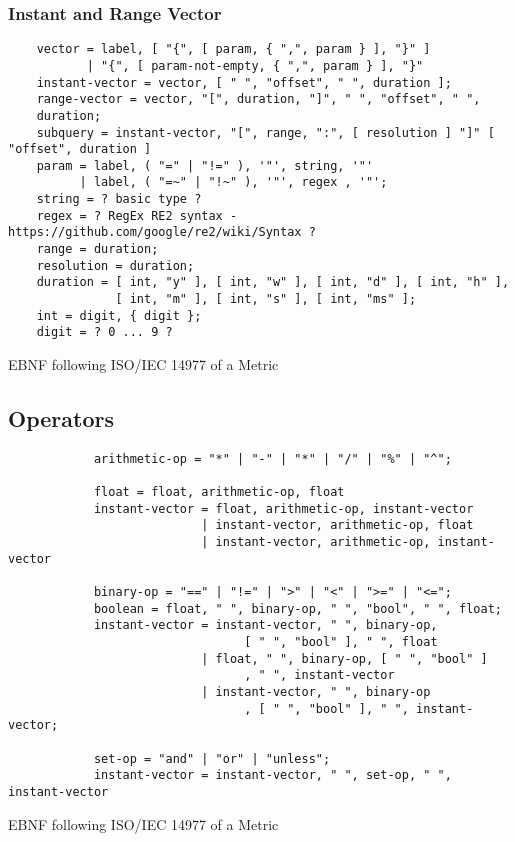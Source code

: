 \subsubsection{Instant and Range Vector}
\begin{listing}[H]
\begin{samepage}
\begin{verbatim}
	vector = label, [ "{", [ param, { ",", param } ], "}" ]
	       | "{", [ param-not-empty, { ",", param } ], "}"
	instant-vector = vector, [ " ", "offset", " ", duration ];
	range-vector = vector, "[", duration, "]", " ", "offset", " ",
	duration;
	subquery = instant-vector, "[", range, ":", [ resolution ] "]" [ "offset", duration ]
	param = label, ( "=" | "!=" ), '"', string, '"'
	      | label, ( "=~" | "!~" ), '"', regex , '"';
	string = ? basic type ?
	regex = ? RegEx RE2 syntax - https://github.com/google/re2/wiki/Syntax ?
	range = duration;
	resolution = duration;
	duration = [ int, "y" ], [ int, "w" ], [ int, "d" ], [ int, "h" ], 
		       [ int, "m" ], [ int, "s" ], [ int, "ms" ];
	int = digit, { digit };
	digit = ? 0 ... 9 ?
\end{verbatim}
\caption{EBNF following ISO/IEC 14977 of a Metric}
\label{lst:promql_vector}
\end{samepage}
\end{listing}

%
%	

\subsection{Operators}

\begin{listing}[H]
	\begin{samepage}
		\begin{verbatim}
			arithmetic-op = "*" | "-" | "*" | "/" | "%" | "^";
			
			float = float, arithmetic-op, float
			instant-vector = float, arithmetic-op, instant-vector
			               | instant-vector, arithmetic-op, float
			               | instant-vector, arithmetic-op, instant-vector
			
			binary-op = "==" | "!=" | ">" | "<" | ">=" | "<=";
			boolean = float, " ", binary-op, " ", "bool", " ", float;
			instant-vector = instant-vector, " ", binary-op, 
			                     [ " ", "bool" ], " ", float
			               | float, " ", binary-op, [ " ", "bool" ]
			                     , " ", instant-vector
			               | instant-vector, " ", binary-op
			                     , [ " ", "bool" ], " ", instant-vector;
			
			set-op = "and" | "or" | "unless";
			instant-vector = instant-vector, " ", set-op, " ", instant-vector
		\end{verbatim}
		\caption{EBNF following ISO/IEC 14977 of a Metric}
	\end{samepage}
\end{listing}


